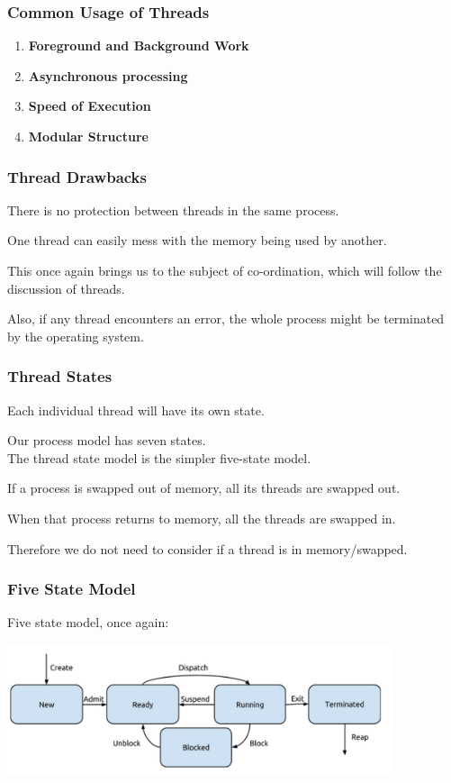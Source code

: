 \begin{frame}
\frametitle{Common Usage of Threads}

\begin{enumerate}
	\item \textbf{Foreground and Background Work}
	\item \textbf{Asynchronous processing}
	\item \textbf{Speed of Execution}
	\item \textbf{Modular Structure}
\end{enumerate}

\end{frame}

\begin{frame}
\frametitle{Thread Drawbacks}

There is no protection between threads in the same process. 

One thread can easily mess with the memory being used by another. 

This once again brings us to the subject of co-ordination, which will follow the discussion of threads.

Also, if any thread encounters an error, the whole process might be terminated by the operating system.

\end{frame}

\begin{frame}
\frametitle{Thread States}
Each individual thread will have its own state. 

Our process model has seven states.\\
\quad The thread state model is the simpler five-state model. 

If a process is swapped out of memory, all its threads are swapped out.

When that process returns to memory, all the threads are swapped in.

Therefore we do not need to consider if a thread is in memory/swapped.

\end{frame}

\begin{frame}
\frametitle{Five State Model}
Five state model, once again:

\begin{center}
\includegraphics[width=0.85\textwidth]{images/5-state-model.png}
\end{center}

\end{frame}

